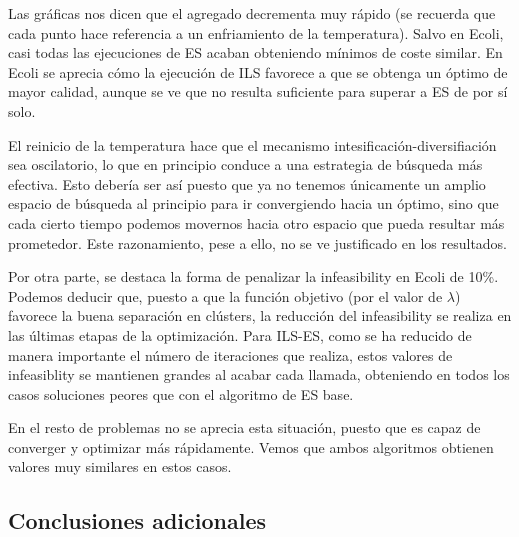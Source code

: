 Las gráficas nos dicen que el agregado decrementa muy rápido (se recuerda que cada punto hace referencia a un enfriamiento de la temperatura). Salvo en Ecoli, casi todas las ejecuciones de ES acaban obteniendo mínimos de coste similar. En Ecoli se aprecia cómo la ejecución de ILS favorece a que se obtenga un óptimo de mayor calidad, aunque se ve que no resulta suficiente para superar a ES de por sí solo.


\vspace{\baselineskip}

El reinicio de la temperatura hace que el mecanismo intesificación-diversifiación sea oscilatorio, lo que en principio conduce a una estrategia de búsqueda más efectiva. Esto debería ser así puesto que ya no tenemos únicamente un amplio espacio de búsqueda al principio para ir convergiendo hacia un óptimo, sino que cada cierto tiempo podemos movernos hacia otro espacio que pueda resultar más prometedor. Este razonamiento, pese a ello, no se ve justificado en los resultados.

\vspace{\baselineskip}

Por otra parte, se destaca la forma de penalizar la infeasibility en Ecoli de 10\%. Podemos deducir que, puesto a que la función objetivo (por el valor de $\lambda$) favorece la buena separación en clústers, la reducción del infeasibility se realiza en las últimas etapas de la optimización. Para ILS-ES, como se ha reducido de manera importante el número de iteraciones que realiza, estos valores de infeasiblity se mantienen grandes al acabar cada llamada, obteniendo en todos los casos soluciones peores que con el algoritmo de ES base. 

En el resto de problemas no se aprecia esta situación, puesto que es capaz de converger y optimizar más rápidamente. Vemos que ambos algoritmos obtienen valores muy similares en estos casos.


\subsection{Conclusiones adicionales}

